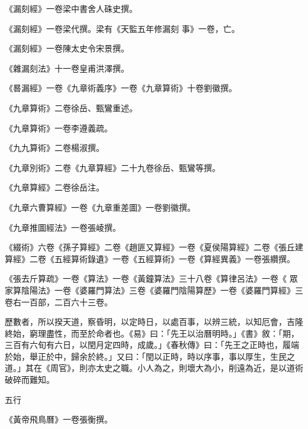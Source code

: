 \begin{pinyinscope}
 《漏刻經》一卷梁中書舍人硃史撰。



 《漏刻經》一卷梁代撰。梁有《天監五年修漏刻
 事》一卷，亡。



 《漏刻經》一卷陳太史令宋景撰。



 《雜漏刻法》十一卷皇甫洪澤撰。



 《晷漏經》一卷《九章術義序》一卷《九章算術》十卷劉徽撰。



 《九章算術》二卷徐岳、甄鸞重述。



 《九章算術》一卷李遵義疏。



 《九九算術》二卷楊淑撰。



 《九章別術》二卷《九章算經》二十九卷徐岳、甄鸞等撰。



 《九章算經》二卷徐岳注。



 《九章六曹算經》一卷《九章重差圖》一卷劉徽撰。



 《九章推圖經法》一卷張崚撰。



 《綴術》六卷《孫子算經》二卷《趙匪又算經》一卷《夏侯陽算經》二卷《張丘建算經》二卷《五經算術錄遺》一卷《五經算術》一卷《算經異義》一卷張纘撰。



 《張去斤算疏》一卷《算法》一卷《黃鐘算法》三十八卷《算律呂法》一卷《
 眾家算陰陽法》一卷《婆羅門算法》三卷《婆羅門陰陽算歷》一卷《婆羅門算經》三卷右一百部，二百六十三卷。



 歷數者，所以揆天道，察昏明，以定時日，以處百事，以辨三統，以知厄會，吉隆終始，窮理盡性，而至於命者也。《易》曰：「先王以治曆明時。」《書》敘：「期，三百有六旬有六日，以閏月定四時，成歲。」《春秋傳》曰：「先王之正時也，履端於始，舉正於中，歸余於終。」又曰：「閏以正時，時以序事，事以厚生，生民之道。」其在《周官》，則亦太史之職。小人為之，則壞大為小，削遠為近，是以道術破碎而難知。



 五行



 《黃帝飛鳥曆》一卷張衡撰。




\end{pinyinscope}
